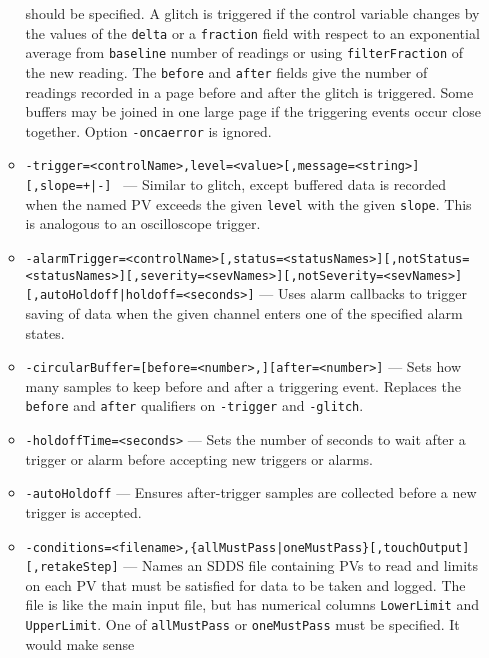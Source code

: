 \begin{itemize}
\begin{itemize}
                should be specified. A glitch is triggered if the control
                variable changes by the values of the \verb+delta+ or a \verb+fraction+ field with respect to an exponential
                average from \verb+baseline+ number of readings or using \verb+filterFraction+ of the new reading.
                The \verb+before+ and \verb+after+ fields give the number of readings recorded in a page
                before and after the glitch is triggered. Some buffers may be joined in
                one large page if the triggering events occur close together.
                Option \verb+-oncaerror+ is ignored.
        \item {\tt -trigger=<controlName>,level=<value>[,message=<string>][,slope={+|-}] \newline
[,before=<number>][,after=<number>][,autoArm][,{autoHoldoff|holdoff=<seconds>}]} --- Similar to glitch,
                except buffered data is recorded when the named PV exceeds
                the given \verb+level+ with the given \verb+slope+. This is analogous to an oscilloscope
                trigger.
        \item {\tt -alarmTrigger=<controlName>[,status=<statusNames>][,notStatus=<statusNames>][,severity=<sevNames>][,notSeverity=<sevNames>][,{autoHoldoff|holdoff=<seconds>}]} ---
                Uses alarm callbacks to trigger saving of data when the given channel enters one
                of the specified alarm states.
        \item {\tt -circularBuffer=[before=<number>,][after=<number>]} --- Sets how many samples to keep before and after
                a triggering event. Replaces the \verb+before+ and \verb+after+ qualifiers on \verb+-trigger+ and \verb+-glitch+.
        \item {\tt -holdoffTime=<seconds>} --- Sets the number of seconds to wait after a trigger or alarm
                before accepting new triggers or alarms.
        \item {\tt -autoHoldoff} --- Ensures after-trigger samples are collected before a new trigger is accepted.
        \item {\verb+-conditions=<filename>,{allMustPass|oneMustPass}[,touchOutput][,retakeStep]+} ---
                Names an SDDS file containing PVs to read and limits on each PV that must
                be satisfied for data to be taken and logged. The file is like the main
                input file, but has numerical columns \verb+LowerLimit+ and \verb+UpperLimit+.
                One of \verb+allMustPass+ or \verb+oneMustPass+ must be specified. It would make sense

\end{itemize}
\end{itemize}

